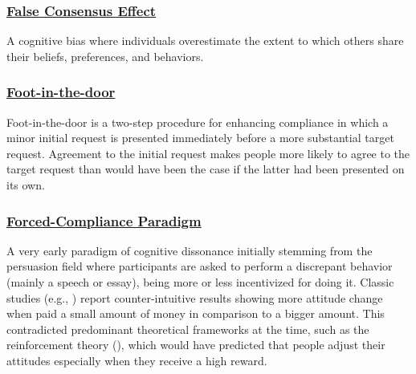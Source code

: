 \documentclass[
  letterpaper,
]{book}
\begin{document}
\subsubsection*{\texorpdfstring{\hyperref[def-falseconsensus]{False
Consensus
Effect}}{False Consensus Effect}}\label{false-consensus-effect-1}

A cognitive bias where individuals overestimate the extent to which
others share their beliefs, preferences, and behaviors.

\subsubsection*{\texorpdfstring{\hyperref[def-footinthedoor]{Foot-in-the-door}}{Foot-in-the-door}}\label{foot-in-the-door}

Foot-in-the-door is a two-step procedure for enhancing compliance in
which a minor initial request is presented immediately before a more
substantial target request. Agreement to the initial request makes
people more likely to agree to the target request than would have been
the case if the latter had been presented on its own.

\subsubsection*{\texorpdfstring{\hyperref[def-forcedcomplianceparadigm]{Forced-Compliance
Paradigm}}{Forced-Compliance Paradigm}}\label{forced-compliance-paradigm}

A very early paradigm of cognitive dissonance initially stemming from
the persuasion field where participants are asked to perform a
discrepant behavior (mainly a speech or essay), being more or less
incentivized for doing it. Classic studies (e.g.,
)
report counter-intuitive results showing more attitude change when paid
a small amount of money in comparison to a bigger amount. This
contradicted predominant theoretical frameworks at the time, such as the
reinforcement theory (), which would have predicted that people adjust their attitudes
especially when they receive a high reward.
\end{document}
